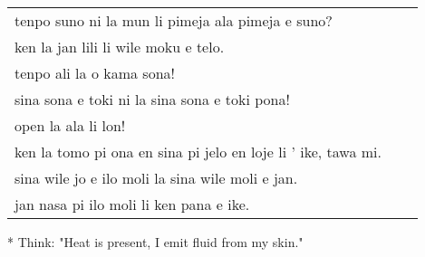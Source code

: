 \begin{supertabular}{p{5,5cm}|ll}
tenpo suno ni la mun li pimeja ala pimeja e suno? &&  \\ %
ken la jan lili li wile moku e telo.  &&   \\ %
tenpo ali la o kama sona!   &&  \\ %
sina sona e toki ni la sina sona e toki pona!   &&  \\ %
open la ala li lon! &&  \\  %
ken la tomo pi ona en sina pi jelo en loje li ' ike, tawa mi. &&  \\  %
sina wile jo e ilo moli la sina wile moli e jan. &&  \\  %
jan nasa pi ilo moli li ken pana e ike. &&  \\ %
\end{supertabular}

* Think: "Heat is present, I emit fluid from my skin."
